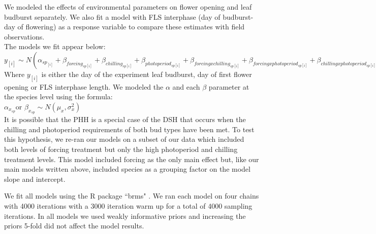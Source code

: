 \documentclass[11pt]{article}
\begin{document}
We modeled the effects of environmental parameters on flower opening and leaf budburst separately.
We also fit a model with FLS interphase (day of budburst- day of flowering) as a response variable to compare these estimates with field observations.\\

The models we fit appear below:\\

$y_{[i]} \sim N(\alpha_{sp_{[i]}}+\beta_{forcing_{sp[i]}}+\beta_{chilling_{sp[i]}}+\beta_{photoperiod_{sp[i]}}+\beta_{forcing x chilling_{sp[i]}}+\beta_{forcing x photoperiod_{sp[i]}}+\beta_{chilling x photoperiod_{sp[i]}})$\\

Where $y_{[i]}$ is either the day of the experiment leaf budburst, day of first flower opening or FLS interphase length.  We modeled the $\alpha$ and each $\beta$ parameter at the species level using the formula:\\

$\alpha_{x_{sp}} $or $\beta_{x_{sp}} \sim N(\mu_x,\sigma^2_x)$\\

\noindent It is possible that the PHH is a special case of the DSH that occurs when the chilling and photoperiod requirements of both bud types have been met. To test this hypothesis, we re-ran our models on a subset of our data which included both levels of forcing treatment but only the high photoperiod and chilling treatment levels. This model included forcing as the only main effect but, like our main models written above, included species as a grouping factor on the model slope and intercept. 

\noindent We fit all models using the R package ``brms" \citep{Burkner2018}. We ran each model on four chains with 4000 iterations with a 3000 iteration warm up for a total of 4000 sampling iterations. In all models we used weakly informative priors and increasing the priors 5-fold did not affect the model results.\\

 
\end{document}
